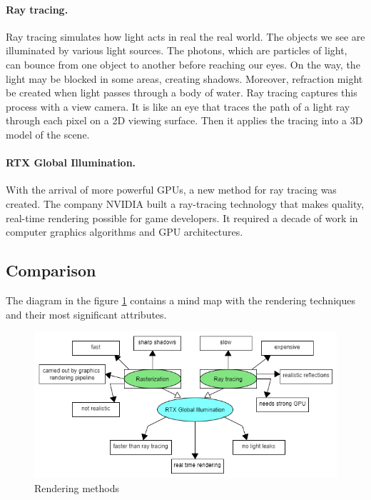 \documentclass[10pt,twoside,english,a4paper]{article}
\begin{document}
\paragraph{Ray tracing.}
Ray tracing simulates how light acts in real the real world. The objects we see are illuminated by various light sources. The photons, which are particles of light, can bounce from one object to another before reaching our eyes. On the way, the light may be blocked in some areas, creating shadows. Moreover, refraction might be created when light passes through a body of water. Ray tracing captures this process with a view camera. It is like an eye that traces the path of a light ray through each pixel on a 2D viewing surface. Then it applies the tracing into a 3D model of the scene. \cite{caulfield}

\paragraph{RTX Global Illumination.}
With the arrival of more powerful GPUs, a new method for ray tracing was created. The company NVIDIA built a ray-tracing technology that makes quality, real-time rendering possible for game developers. It required a decade of work in computer graphics algorithms and GPU architectures. \cite{caulfield}

\subsection{Comparison} \label{comparison}

The diagram in the figure \ref{fig:diag} contains a mind map with the rendering techniques and their most significant attributes. 
 
 \begin{figure}[ht]
    \centering
    \includegraphics[scale=0.5]{diag.png}
    \caption{Rendering methods\cite{caulfield} \cite{wang}}
    \label{fig:diag}
\end{figure}
\end{document}
